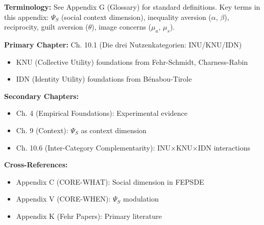 \begin{tcolorbox}[colback=gray!5!white, colframe=gray!50!black]
\textbf{Terminology:} See Appendix G (Glossary) for standard definitions.
Key terms in this appendix: $\Psi_S$ (social context dimension),
inequality aversion ($\alpha$, $\beta$), reciprocity, guilt aversion ($\theta$),
image concerns ($\mu_a$, $\mu_s$).
\end{tcolorbox}

\begin{tcolorbox}[colback=green!5!white, colframe=green!75!black,
    title=\textbf{Chapter References}]

\textbf{Primary Chapter:} Ch. 10.1 (Die drei Nutzenkategorien: INU/KNU/IDN)
\begin{itemize}[nosep]
    \item KNU (Collective Utility) foundations from Fehr-Schmidt, Charness-Rabin
    \item IDN (Identity Utility) foundations from Bénabou-Tirole
\end{itemize}

\textbf{Secondary Chapters:}
\begin{itemize}[nosep]
    \item Ch. 4 (Empirical Foundations): Experimental evidence
    \item Ch. 9 (Context): $\Psi_S$ as context dimension
    \item Ch. 10.6 (Inter-Category Complementarity): INU×KNU×IDN interactions
\end{itemize}

\textbf{Cross-References:}
\begin{itemize}[nosep]
    \item Appendix C (CORE-WHAT): Social dimension in FEPSDE
    \item Appendix V (CORE-WHEN): $\Psi_S$ modulation
    \item Appendix K (Fehr Papers): Primary literature
\end{itemize}

\end{tcolorbox}

